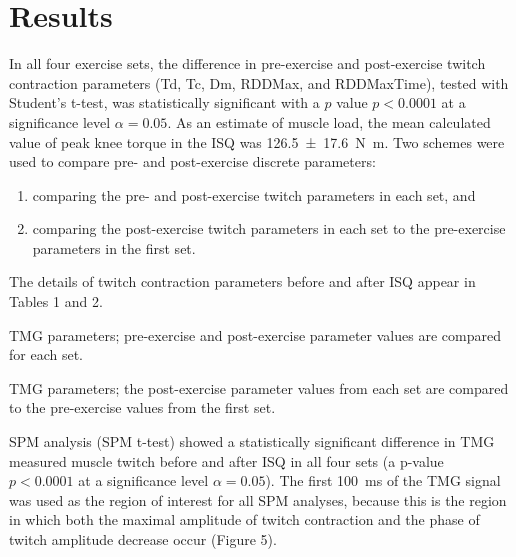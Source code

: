 \documentclass[utf8]{style/FrontiersinHarvard}
\begin{document}
\section{Results}
In all four exercise sets, the difference in pre-exercise and post-exercise twitch contraction parameters (Td, Tc, Dm, RDDMax, and RDDMaxTime), tested with Student's t-test, was statistically significant with a $ p $ value $ p < 0.0001 $ at a significance level $ \alpha = 0.05 $.
As an estimate of muscle load, the mean calculated value of peak knee torque in the ISQ was \SI{126.5 \pm 17.6}{\newton \meter}.
Two schemes were used to compare pre- and post-exercise discrete parameters:
\begin{enumerate}

    \item comparing the pre- and post-exercise twitch parameters in each set, and

    \item comparing the post-exercise twitch parameters in each set to the pre-exercise parameters in the first set.

\end{enumerate}
The details of twitch contraction parameters before and after ISQ appear in Tables 1 and 2.

\begin{table}[htb!]
    \centering
    \caption{TMG parameters; pre-exercise and post-exercise parameter values are compared for each set.}
    \vspace{1ex}

    \renewcommand{\arraystretch}{1.2}
    
    \label{tab:tmg_params}
\end{table}

\begin{table}[htb!]
    \centering
    \caption{TMG parameters; the post-exercise parameter values from each set are compared to the pre-exercise values from the first set.}
    \vspace{1ex}

    \renewcommand{\arraystretch}{1.2}
    
    \label{tab:tmg_params_staggered}
\end{table}

SPM analysis (SPM t-test) showed a statistically significant difference in TMG measured muscle twitch before and after ISQ in all four sets (a p-value $ p < 0.0001 $ at a significance level $ \alpha = 0.05 $).
The first \SI{100}{\milli \second} of the TMG signal was used as the region of interest for all SPM analyses, because this is the region in which both the maximal amplitude of twitch contraction and the phase of twitch amplitude decrease occur (Figure 5).
\end{document}
